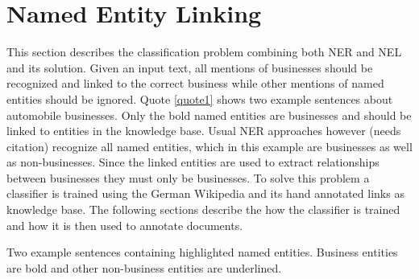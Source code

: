 \section{Named Entity Linking}
\label{sec:NEL}
This section describes the classification problem combining both NER and NEL and its solution. Given an input text, all mentions of businesses should be recognized and linked to the correct business while other mentions of named entities should be ignored. Quote \ref{quote1} shows two example sentences about automobile businesses. Only the bold named entities are businesses and should be linked to entities in the knowledge base. Usual NER approaches however (needs citation) recognize all named entities, which in this example are businesses as well as non-businesses. Since the linked entities are used to extract relationships between businesses they must only be businesses. To solve this problem a classifier is trained using the German Wikipedia and its hand annotated links as knowledge base. The following sections describe the how the classifier is trained and how it is then used to annotate documents.\\
\begin{nscenter}
	\begin{quotecaption}
	Two example sentences containing highlighted named entities. Business entities are bold and other non-business entities are underlined.
	\label{quote1}
	\end{quotecaption}
\end{nscenter}

